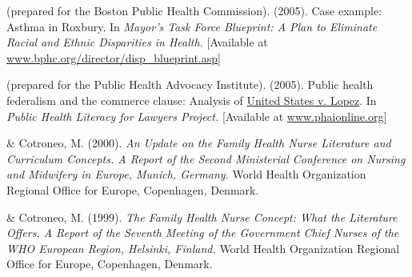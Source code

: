 \documentclass[10pt,]{article}
\begin{document}
{{{{{{{{{{{{{{{\begin{hangparas}{.25in}{1}

 (prepared for the Boston Public Health Commission). (2005). Case example: Asthma in Roxbury. In {\textit {Mayor’s Task Force Blueprint: A Plan to Eliminate Racial and Ethnic Disparities in Health.}} [Available at \href{http://www.bphc.org/director/disp_blueprint.asp}{\ttfamily www.bphc.org/director/disp\_blueprint.asp}]

\end{hangparas}

\vspace{4mm}

\begin{hangparas}{.25in}{1}

 (prepared for the Public Health Advocacy Institute). (2005). Public health federalism and the commerce clause: Analysis of {\underline {United States v. Lopez}}. In {\textit {Public Health Literacy for Lawyers Project.}} [Available at \href{http://www.phaionline.org}{\ttfamily www.phaionline.org}]

\end{hangparas}

\vspace{4mm}

\begin{hangparas}{.25in}{1}

 \& Cotroneo, M. (2000). {\textit {An Update on the Family Health Nurse Literature and Curriculum Concepts. A Report of the Second Ministerial Conference on Nursing and Midwifery in Europe, Munich, Germany.}} World Health Organization Regional Office for Europe, Copenhagen, Denmark.

\end{hangparas}

\vspace{4mm}

\begin{hangparas}{.25in}{1}

 \& Cotroneo, M. (1999). {\textit {The Family Health Nurse Concept: What the Literature Offers. A Report of the Seventh Meeting of the Government Chief Nurses of the WHO European Region, Helsinki, Finland.}} World Health Organization Regional Office for Europe, Copenhagen, Denmark.

\end{hangparas}

\vspace{4mm}

}}}}}}}}}}}}}}}
\end{document}
